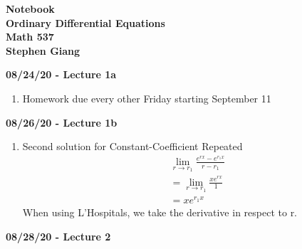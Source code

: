 \documentclass[11pt]{article}
\newcommand{\skipline}{\vspace{\baselineskip}}
\begin{document}
	
	\begin{center}
		\textbf{Notebook} \\
		\textbf{Ordinary Differential Equations} \\
		\textbf{Math 537} \\
		\textbf{Stephen Giang} \\
	\end{center}
	\skipline
	\textbf{08/24/20 - Lecture 1a}
	\begin{enumerate}
		\item Homework due every other Friday starting September 11 
	\end{enumerate}
	\skipline
	\textbf{08/26/20 - Lecture 1b}
	\begin{enumerate}
		\item Second solution for Constant-Coefficient Repeated
			\begin{align*}
				&\lim\limits_{r \rightarrow r_1} \frac{e^{rx} - e^{r_1x}}{r - r_1} \\
				&= \lim\limits_{r \rightarrow r_1} \frac{xe^{rx}}{1} \\
				&= xe^{r_1x}
			\end{align*}
			When using L'Hospitals, we take the derivative in respect to r.  
	\end{enumerate}
	\skipline
	\textbf{08/28/20 - Lecture 2}
\end{document}
